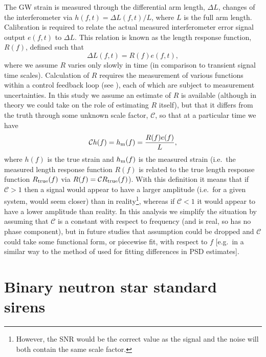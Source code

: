 \documentclass[prd, twocolumn, lengthcheck, superscriptaddress, showpacs, letterpaper, nofootinbib]{revtex4-1}
\newcommand{\scf}{\ensuremath{\mathcal{C}}}
\begin{document}
The \ac{GW} strain is measured through the differential arm length, $\Delta L$,
changes of the interferometer via $h(f,t) = \Delta L(f,t) / L$, where $L$ is
the full arm length. Calibration is required to relate the actual measured
interferometer error signal output $e(f, t)$ to $\Delta L$.  This relation is
known as the length response function, $R(f)$, defined such that
%
\begin{equation}
\Delta L(f,t) = R(f) e(f, t),
\end{equation}
%
where we assume $R$ varies only slowly in time (in comparison to transient
signal time scales). Calculation of $R$ requires the measurement of various
functions within a control feedback loop (see \cite{2010NIMPA.624..223A}),
each of which are subject to measurement uncertainties. In this study
we assume an estimate of $R$ is available (although in theory we could
take on the role of estimating $R$ itself), but that it differs from the truth
through some unknown scale factor, $\scf$, so that at a particular time we have
%
\begin{equation}\label{eq:scalefactor}
\scf h(f) = h_{\rm m}(f) = \frac{R(f) e(f)}{L},
\end{equation}
%
where $h(f)$ is the true strain and $h_{\rm m}(f)$ is the measured strain
(i.e.\ the measured length response function $R(f)$ is related to the
true length response function $R_{\rm true}(f)$ via $R(f) = \scf R_{\rm
true}(f)$). With this definition it means that if $\scf > 1$ then a signal
would appear to have a larger amplitude (i.e.\ for a given system,
would seem closer) than in reality\footnote{However, the \ac{SNR} would be
the correct value as the signal and the noise will both contain the same scale
factor.}, whereas if $\scf < 1$ it would appear to have a lower amplitude than
reality.  In this analysis we simplify the situation by assuming that
$\scf$ is a constant with respect to frequency (and is real, so has no phase
component), but in future studies that assumption could be dropped and $\scf$
could take some functional form, or piecewise fit, with respect to $f$ [e.g.\
in a similar way to the method of \cite{2013PhRvD..88h4044L} used for fitting
differences in \ac{PSD} estimates].

\section{Binary neutron star standard sirens\label{sec:sirens}}
\end{document}
